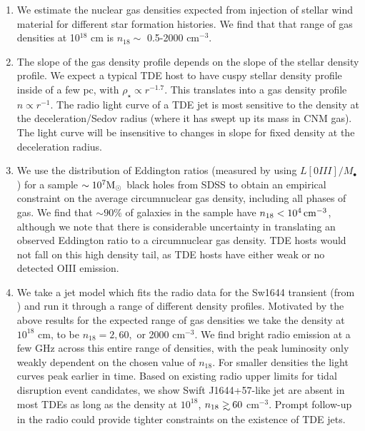 \documentclass[usenatbib,fleqn]{mnras}
\newcommand\gsim{\mathrel{\rlap{\lower4pt\hbox{\hskip1pt$\sim$}}
    \raise1pt\hbox{$>$}}}
\newcommand{\Mbh}[1][]{M_{\bullet#1}}
\newcommand{\Msun}{{\rm M_\odot}}
\begin{document}
\begin{enumerate}
\item We estimate the nuclear gas densities expected from injection of
  stellar wind material for different star formation histories. We
  find that that range of gas densities at 10$^{18}$ cm is $n_{18}
  \sim$ 0.5-2000 cm$^{-3}$.

\item The slope of the gas density profile depends on the slope of the
  stellar density profile. We expect a typical TDE host to have cuspy
  stellar density profile inside of a few pc, with $\rho_\star
  \propto r^{-1.7}$. This translates into a gas density profile $n
  \propto r^{-1}$. The radio light curve of a TDE jet is most
  sensitive to the density at the deceleration/Sedov radius (where it
  has swept up its mass in CNM gas). The light curve will be
  insensitive to changes in slope for fixed density at the
  deceleration radius.

\item We use the distribution of Eddington ratios (measured by
  \citealt{Kauffmann&Heckman2009} using $L[0III]/\Mbh$) for a sample
  $\sim 10^{7} \Msun$ black holes from SDSS to obtain an empirical
  constraint on the average circumnuclear gas density, including all
  phases of gas. We find that $\sim90\%$ of galaxies in the sample
  have $n_{18}<10^{4} \, {\rm cm}^{-3}$, although we note that there is
  considerable uncertainty in translating an observed Eddington ratio
  to a circumnuclear gas density. TDE hosts would not fall on this
  high density tail, as TDE hosts have either weak or no detected OIII
  emission.

\item We take a jet model which fits the radio data for the Sw1644
  transient (from \citealt{Mimica+2015}) and run it through a range of
  different density profiles. Motivated by the above results for the
  expected range of gas densities we take the density at $10^{18}$ cm,
  to be $n_{18}=2, 60,$ or 2000 cm$^{-3}$. We find bright radio
  emission at a few GHz across this entire range of densities, with
  the peak luminosity only weakly dependent on the chosen value of
  $n_{18}$.  For smaller densities the light curves peak earlier in
  time. Based on existing radio upper limits for tidal disruption
  event candidates, we show Swift J1644+57-like jet are absent in most TDEs
  as long as the density at $10^{18}$, $n_{18} \gsim  60$
  cm$^{-3}$. Prompt follow-up in the radio could provide tighter
  constraints on the existence of TDE jets.  
\end{enumerate}
\end{document}
